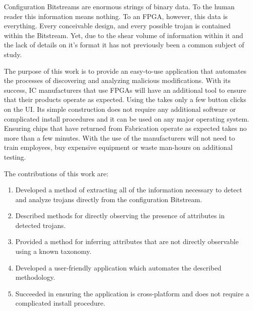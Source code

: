 \label{concl}
Configuration \gls{Bitstream}s are enormous strings of binary data.
To the human reader this information means nothing.
To an \acrshort{FPGA}, however, this data is everything.
Every conceivable design, and every possible trojan is contained within the \gls{Bitstream}.
Yet, due to the shear volume of information within it and the lack of details on it's format it has not previously been a common subject of study.

The purpose of this work is to provide an easy-to-use application that automates the processes of discovering and analyzing malicious modifications.
With its success, \acrlong{IC} manufacturers that use \acrshort{FPGA}s will have an additional tool to ensure that their products operate as expected.
Using the \NameNoPeriod takes only a few button clicks on the \acrlong{UI}.
Its simple construction does not require any additional software or complicated install procedures and it can be used on any major operating system.
Ensuring chips that have returned from Fabrication operate as expected takes no more than a few minutes.
With the use of the \NameNoPeriod manufacturers will not need to train employees, buy expensive equipment or waste man-hours on additional testing.

The contributions of this work are:
\begin{enumerate}
	\item Developed a method of extracting all of the information necessary to detect and analyze trojans directly from the configuration \gls{Bitstream}. 
	\item Described methods for directly observing the presence of attributes in detected trojans.
	\item Provided a method for inferring attributes that are not directly observable using a known taxonomy.
	\item Developed a user-friendly application which automates the described methodology.
	\item Succeeded in ensuring the application is cross-platform and does not require a complicated install procedure.
\end{enumerate}




